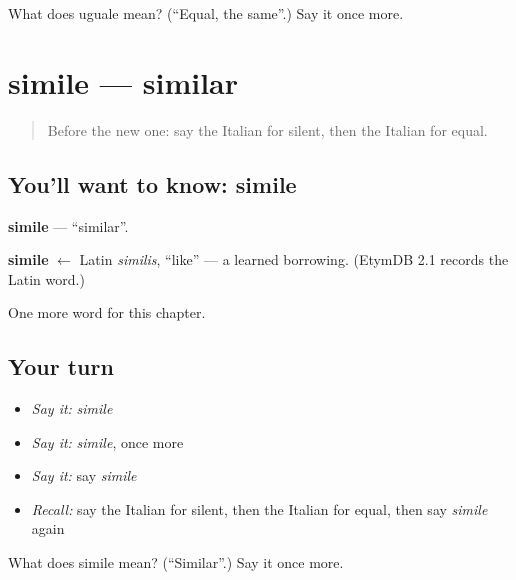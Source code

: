 \begin{tcolorbox}[breakable,colback=teal!4,colframe=teal!35!black,title={Before you move on}]
What does uguale mean? (\textquotedblleft{}Equal, the same\textquotedblright{}.) Say it once more.
\end{tcolorbox}
\section[simile]{simile — similar}

\label{lesson:IT-C219-simile}



\begin{quote}
Before the new one: say the Italian for silent, then the Italian for equal.
\end{quote}

\subsection*{You'll want to know: simile}
\textbf{simile} — \textquotedblleft{}similar\textquotedblright{}.

\begin{cousinweb}
\textbf{simile} $\leftarrow$ Latin \emph{similis}, \textquotedblleft{}like\textquotedblright{} — a learned borrowing. (EtymDB 2.1 records the Latin word.)
\end{cousinweb}

\begin{grammarlens}[title={What you've built}]
One more word for this chapter.
\end{grammarlens}

\subsection*{Your turn}
\begin{itemize}
\raggedright
  \item \emph{Say it:} \emph{simile}
  \item \emph{Say it:} \emph{simile}, once more
  \item \emph{Say it:} say \emph{simile}
  \item \emph{Recall:} say the Italian for silent, then the Italian for equal, then say \emph{simile} again
\end{itemize}

\begin{tcolorbox}[breakable,colback=teal!4,colframe=teal!35!black,title={Before you move on}]
What does simile mean? (\textquotedblleft{}Similar\textquotedblright{}.) Say it once more.
\end{tcolorbox}
